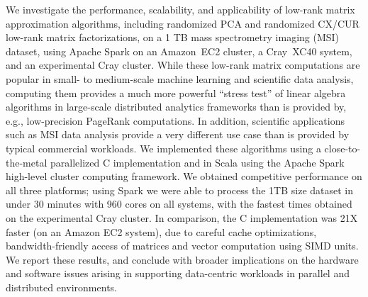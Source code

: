 We investigate the performance, scalability, and applicability of low-rank
matrix approximation algorithms, including randomized PCA and randomized CX/CUR
low-rank matrix factorizations, on a 1 TB mass spectrometry imaging (MSI)
dataset, using Apache Spark on an Amazon~EC2 cluster, a Cray~XC40 system, and
an experimental Cray cluster. While these low-rank matrix computations are
popular in small- to medium-scale machine learning and scientific data
analysis, computing them provides a much more powerful ``stress test'' of linear
algebra algorithms in large-scale distributed analytics frameworks than is
provided by, e.g., low-precision PageRank computations. In addition,
scientific applications such as MSI data analysis provide a very different use
case than is provided by typical commercial workloads. We implemented these
algorithms using a close-to-the-metal parallelized C implementation and in Scala
using the Apache Spark high-level cluster computing framework. We obtained
competitive performance on all three platforms; using Spark we were able to
process the 1TB size dataset in under 30 minutes with 960 cores on all systems,
with the fastest times obtained on the experimental Cray cluster. In
comparison, the C implementation was 21X faster (on an Amazon EC2 system), due
to careful cache optimizations, bandwidth-friendly access of matrices and
vector computation using SIMD units. We report these results, and conclude
with broader implications on the hardware and software issues arising in
supporting data-centric workloads in parallel and distributed environments.


